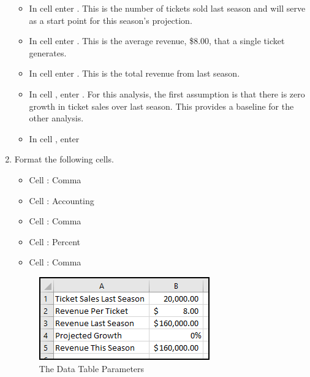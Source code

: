 \begin{enumbox}
\begin{enumerate}
		\begin{itemize}
			\item In cell  enter . This is the number of tickets sold last season and will serve as a start point for this season's projection.
			\item In cell  enter . This is the average revenue, \$$ 8.00 $, that a single ticket generates.
			\item In cell  enter . This is the total revenue from last season. 
			\item In cell , enter . For this analysis, the first assumption is that there is zero growth in ticket sales over last season. This provides a baseline for the other analysis.
			\item In cell , enter 
		\end{itemize}
	
		\item Format the following cells.
	
		\begin{itemize}
			\item Cell : Comma
			\item Cell : Accounting
			\item Cell : Comma
			\item Cell : Percent
			\item Cell : Comma
		\end{itemize}
	

		\begin{figure}[H]
			\centering
			\includegraphics[width=\maxwidth{.65\linewidth}]{gfx/ch08_fig40}
			\caption{The Data Table Parameters}
			\label{08:fig40}
		\end{figure}


\end{enumerate}
\end{enumbox}
